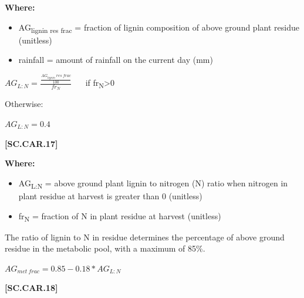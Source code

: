         \textbf{Where:}
            
        \begin{itemize}
            \item AG\textsubscript{lignin res frac} = fraction of lignin composition of above ground plant residue (unitless)
            \item rainfall = amount of rainfall on the current day (mm)
        \end{itemize}
        \vspace{0.5cm}


    \begin{center}
\(AG_{L:N}=\frac{\frac{AG_{lignin}\ res\ frac}{100}}{fr_N}\ \ \ \ \ \ \) if fr\textsubscript{N}>0
\vspace{0.3cm}


Otherwise:
\vspace{0.2cm}

\(AG_{L:N}=0.4	\)
    \end{center}
        \vspace{0.5cm} 
    
            {\raggedleft \textbf{[SC.CAR.17]}\par}
            \vspace{0.5cm}

        \textbf{Where:}
            
        \begin{itemize}
            \item AG\textsubscript{L:N} = above ground plant lignin to nitrogen (N) ratio when nitrogen in plant residue at harvest is greater than 0 (unitless)
            \item fr\textsubscript{N} = fraction of N in plant residue at harvest (unitless)
        \end{itemize}
        \vspace{0.5cm}

The ratio of lignin to N in residue determines the percentage of above ground residue in the metabolic pool, with a maximum of 85\%.
        \vspace{0.5cm}

    \begin{center}
\(AG_{met\ frac}=0.85-0.18 * AG_{L:N}\)
    \end{center}
        \vspace{0.5cm} 
    
            {\raggedleft \textbf{[SC.CAR.18]}\par}
            \vspace{0.5cm}

